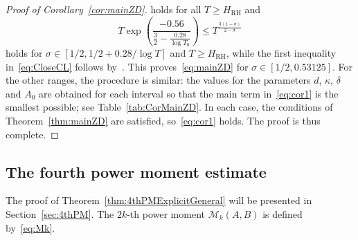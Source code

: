 \documentclass[a4paper,reqno]{amsart}
\theoremstyle{definition}
\begin{document}
\begin{proof}[Proof of Corollary~\ref{cor:mainZD}]
holds for all $T\geq H_{\mathrm{RH}}$ and 
\[
T\exp{\left(\frac{-0.56}{\frac{3}{2}-\frac{0.28}{\log{T_0}}}\right)} \leq T^{\frac{3(1-\sigma)}{2-\sigma}}
\]
holds for $\sigma\in[1/2,1/2+0.28/\log{T}]$ and $T\geq H_{\mathrm{RH}}$, while the first inequality in~\eqref{eq:CloseCL} follows by~\cite{BellottiWong2024}. This proves~\eqref{eq:mainZD} for $\sigma\in[1/2,0.53125]$. For the other ranges, the procedure is similar: the values for the parameters $d$, $\kappa$, $\delta$ and $A_0$ are obtained for each interval so that the main term in~\eqref{eq:cor1} is the smallest possible; see Table~\ref{tab:CorMainZD}. In each case, the conditions of Theorem~\ref{thm:mainZD} are satisfied, so~\eqref{eq:cor1} holds. The proof is thus complete.
\end{proof}

\subsection{The fourth power moment estimate}
\label{subsec:4thPM}

The proof of Theorem~\ref{thm:4thPMExplicitGeneral} will be presented in Section~\ref{sec:4thPM}. The $2k$-th power moment $\mathcal{M}_{k}(A,B)$ is defined by~\eqref{eq:Mk}.
\end{document}

